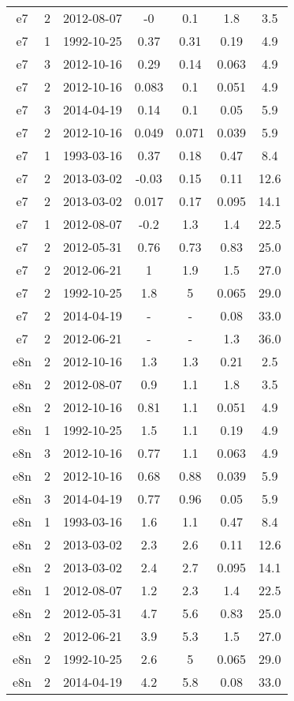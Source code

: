 \begin{table*}[htp]
\begin{tabular}{ccccccc}
e7 & 2 & 2012-08-07 & -0 & 0.1 & 1.8 & 3.5 \\
e7 & 1 & 1992-10-25 & 0.37 & 0.31 & 0.19 & 4.9 \\
e7 & 3 & 2012-10-16 & 0.29 & 0.14 & 0.063 & 4.9 \\
e7 & 2 & 2012-10-16 & 0.083 & 0.1 & 0.051 & 4.9 \\
e7 & 3 & 2014-04-19 & 0.14 & 0.1 & 0.05 & 5.9 \\
e7 & 2 & 2012-10-16 & 0.049 & 0.071 & 0.039 & 5.9 \\
e7 & 1 & 1993-03-16 & 0.37 & 0.18 & 0.47 & 8.4 \\
e7 & 2 & 2013-03-02 & -0.03 & 0.15 & 0.11 & 12.6 \\
e7 & 2 & 2013-03-02 & 0.017 & 0.17 & 0.095 & 14.1 \\
e7 & 1 & 2012-08-07 & -0.2 & 1.3 & 1.4 & 22.5 \\
e7 & 2 & 2012-05-31 & 0.76 & 0.73 & 0.83 & 25.0 \\
e7 & 2 & 2012-06-21 & 1 & 1.9 & 1.5 & 27.0 \\
e7 & 2 & 1992-10-25 & 1.8 & 5 & 0.065 & 29.0 \\
e7 & 2 & 2014-04-19 & - & - & 0.08 & 33.0 \\
e7 & 2 & 2012-06-21 & - & - & 1.3 & 36.0 \\
e8n & 2 & 2012-10-16 & 1.3 & 1.3 & 0.21 & 2.5 \\
e8n & 2 & 2012-08-07 & 0.9 & 1.1 & 1.8 & 3.5 \\
e8n & 2 & 2012-10-16 & 0.81 & 1.1 & 0.051 & 4.9 \\
e8n & 1 & 1992-10-25 & 1.5 & 1.1 & 0.19 & 4.9 \\
e8n & 3 & 2012-10-16 & 0.77 & 1.1 & 0.063 & 4.9 \\
e8n & 2 & 2012-10-16 & 0.68 & 0.88 & 0.039 & 5.9 \\
e8n & 3 & 2014-04-19 & 0.77 & 0.96 & 0.05 & 5.9 \\
e8n & 1 & 1993-03-16 & 1.6 & 1.1 & 0.47 & 8.4 \\
e8n & 2 & 2013-03-02 & 2.3 & 2.6 & 0.11 & 12.6 \\
e8n & 2 & 2013-03-02 & 2.4 & 2.7 & 0.095 & 14.1 \\
e8n & 1 & 2012-08-07 & 1.2 & 2.3 & 1.4 & 22.5 \\
e8n & 2 & 2012-05-31 & 4.7 & 5.6 & 0.83 & 25.0 \\
e8n & 2 & 2012-06-21 & 3.9 & 5.3 & 1.5 & 27.0 \\
e8n & 2 & 1992-10-25 & 2.6 & 5 & 0.065 & 29.0 \\
e8n & 2 & 2014-04-19 & 4.2 & 5.8 & 0.08 & 33.0 \\

\end{tabular}
\end{table*}
